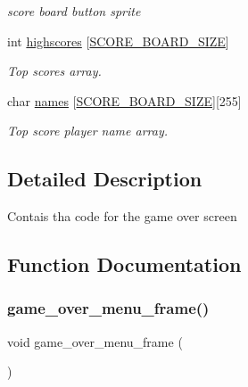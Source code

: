 \begin{DoxyCompactItemize}
\begin{DoxyCompactList}\small\item\em score board button sprite \end{DoxyCompactList}\item 
int \hyperlink{group__Game-Over-Menu_ga10efae42dd260dcc2c52eb07d71da687}{highscores} \mbox{[}\hyperlink{group__utils_ga85e9c9dc96b1373ebdb408da38eb5367}{S\+C\+O\+R\+E\+\_\+\+B\+O\+A\+R\+D\+\_\+\+S\+I\+ZE}\mbox{]}
\begin{DoxyCompactList}\small\item\em Top scores array. \end{DoxyCompactList}\item 
char \hyperlink{group__Game-Over-Menu_ga286661e657548eadd26d0d129c981ea2}{names} \mbox{[}\hyperlink{group__utils_ga85e9c9dc96b1373ebdb408da38eb5367}{S\+C\+O\+R\+E\+\_\+\+B\+O\+A\+R\+D\+\_\+\+S\+I\+ZE}\mbox{]}\mbox{[}255\mbox{]}
\begin{DoxyCompactList}\small\item\em Top score player name array. \end{DoxyCompactList}\end{DoxyCompactItemize}


\subsection{Detailed Description}
Contais tha code for the game over screen 

\subsection{Function Documentation}
\mbox{\label{group__Game-Over-Menu_ga8105461ec4f2f3dc83bf6b821b353144}} 
\subsubsection{\texorpdfstring{game\+\_\+over\+\_\+menu\+\_\+frame()}{game\_over\_menu\_frame()}}
{\footnotesize\ttfamily void game\+\_\+over\+\_\+menu\+\_\+frame (\begin{DoxyParamCaption}{ }\end{DoxyParamCaption})}



